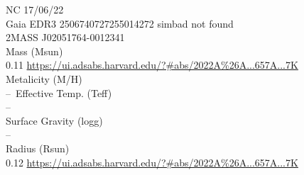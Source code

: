 NC 17/06/22\\
Gaia EDR3 2506740727255014272
simbad not found\\


2MASS J02051764-0012341\\
Mass (Msun)\\
0.11 \url{https://ui.adsabs.harvard.edu/?#abs/2022A%26A...657A...7K}\\
Metalicity (M/H)\\
--\
Effective Temp. (Teff)\\
--\\
Surface Gravity (logg)\\
--\\
Radius (Rsun)\\
0.12 \url{https://ui.adsabs.harvard.edu/?#abs/2022A%26A...657A...7K}\\